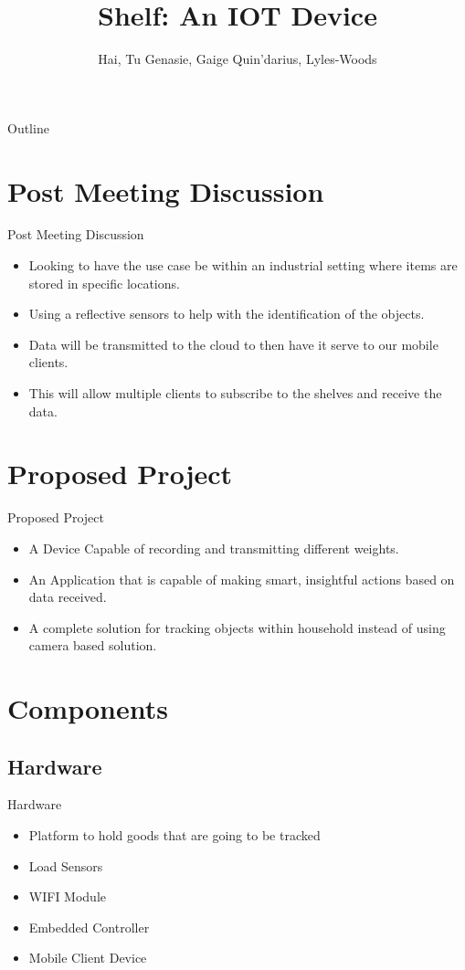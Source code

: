 \documentclass{beamer}
\title{Shelf: An IOT Device}
\author{
	Hai, Tu
	Genasie, Gaige
	Quin'darius, Lyles-Woods
}
\institute{Kennesaw State University}
\begin{document}
\frame{\titlepage}

\begin{frame}{Outline}
	\tableofcontents
\end{frame}
\section{Post Meeting Discussion}
\begin{frame}{Post Meeting Discussion}
\begin{itemize}
\item<1-> Looking to have the use case be within an industrial setting where items are stored in specific locations.
\item<2-> Using a reflective sensors to help with the identification of the objects.
\item<3-> Data will be transmitted to the cloud to then have it serve to our mobile clients.
\item<4-> This will allow multiple clients to subscribe to the shelves and receive the data.
\end{itemize}
\end{frame}

\section{Proposed Project}
\begin{frame}{Proposed Project}
\begin{itemize}
	\item<1-> A Device Capable of recording and transmitting different weights. 		                     \pause
	\item<2-> An Application that is capable of making smart, insightful actions based on data received.     \pause
	\item<3-> A complete solution for tracking objects within household instead of using camera based solution. 
\end{itemize}
\end{frame}

\section{Components}
\subsection{Hardware}
\begin{frame}{Hardware}
\begin{itemize}
	\item<1-> Platform to hold goods that are going to be tracked \pause
	\item<2-> Load Sensors \pause
	\item<3-> WIFI Module \pause
	\item<4-> Embedded Controller \pause
	\item<5-> Mobile Client Device 
\end{itemize}
\end{frame}
\end{document}
